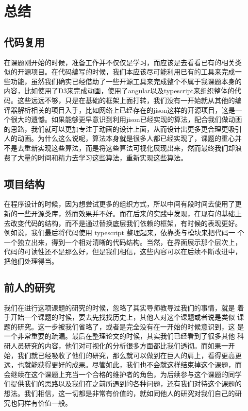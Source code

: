 \section{总结}
\subsection{代码复用}
在课题刚开始的时候，准备工作并不仅仅是学习，而应该是去看看已有的相关类
似的开源项目。在代码编写的时候，我们本应该尽可能利用已有的工具来完成一
些功能，虽然我们确实已经借助了一些开源工具来完成整个不属于我课题本身的
内容，比如使用了D3来完成动画，使用了angular以及typescript来组织整体的代
码。这些远远不够，只是在基础的框架上面打转，我们没有一开始就从其他的编
译器解析相关的项目入手，比如网络上已经存在的jison这样的开源项目，这是一
个很大的遗憾。如果能够更早意识到利用jison已经实现的算法，配合我们做动画
的思路，我们就可以更加专注于动画的设计上面，从而设计出更多更合理更吸引
人的动画。为什么这么说呢，算法本身就是很多人都已经实现了，课题的重心并
不是去重新实现这些算法，而是将这些算法可视化展现出来，然而最终我们却浪
费了大量的时间和精力去学习这些算法，重新实现这些算法。
\subsection{项目结构}
在程序设计的时候，因为想尝试更多的组织方式，所以中间有段时间去使用了更
新的一些开源类库，然而效果并不好。而在后来的实践中发现，在现有的基础上
去改变代码的结构，而不是通过替换底层我们依赖的框架，有时候的表现更好。
例如说，我们最后将代码使用 typescript 整理起来，依靠类与模块来把代码一
个一个独立出来，得到一个相对清晰的代码结构。当然，在界面展示那个层次上，
代码的可读性还不是那么好，但是我们相信，这些内容可以在后续不断改进中，
把他们处理得当。
\subsection{前人的研究}
我们在进行这项课题的研究的时候，忽略了其实导师教导过我们的事情，就是
着手开始一个课题的时候，要去先找找历史上，其他人对这个课题或者说是类似
课题的研究。这一步被我们省略了，或者是完全没有在一开始的时候意识到，这
是一个非常重要的疏漏。最后在整理论文的时候，其实我们已经看到了很多其他
科研人员研究的内容，他们对可视化的分析很多方面都比我们透彻。而如果一开
始，我们就已经吸收了他们的研究，那么就可以做到在巨人的肩上，看得更高更
远，也就能获得更好的成果。尽管如此，我们也不会就这样结束掉这个课题，而
会继续在这个课题上充当一个合格的维护者的角色，为后续参与这个课题的同学
们提供我们的思路以及我们在之前所遇到的各种问题，还有我们对待这个课题的
想法。我们相信，这一切都是非常有价值的，就如同他人的研究对我们自己的研
究也同样有价值一般。
